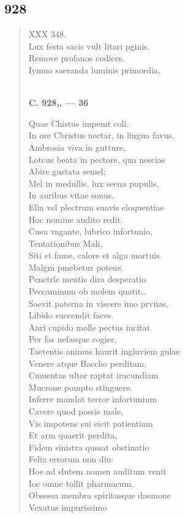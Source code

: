 \documentclass[11pt, a4paper]{report}
\begin{document}
            \subsection*{928}
      \begin{verse}
      XXX 348. \\ Lux festa sacis vult litari pginis. \\ Remove profanos codices. \\ Iymno saeranda luminis primordia, \\ 
        ﻿\pagebreak 
     \marginpar{[350]} \begin{center} \textbf{C. 928,. — 36} \end{center}Quae Chistus impemt coli. \\ In ore Cbristus nectar, in lingua favus, \\ Ambrosia viva in gutture, \\ Lotcus beata in pectore, qua nescias \\ Abire gustata semel; \\ Mel in medullis, lux seena pupulis, \\ In auribus vitae sonus. \\ Elin vel plectrum suavis eloquentiae \\ Hoc nomine audito redit. \\ Cusu vagante, lubrico infortunio, \\ Tentationibus Mali, \\ Siti et fame, calore et algu mortuis \\ Malgm pmebetur potens. \\ Penetrle mentis dira desperatio \\ Peccaminum ob molem quatit,. \\ Saevit paterna in viscere imo prviias, \\ Libido succendit faces. \\ Anri cupido molle pectus incitat \\ Per fas nefasque cogier, \\ Taetentis animus haurit ingluviem gulae \\ Venere atque Baccho perditam, \\ Cmuentus ultor raptat iracundiam \\ Mucrone pompto stinguere. \\ Inferre mandat terror infortunium \\ Cavere quod possis male, \\ Vis impotens sui eicit patientiam \\ Et arm quaerit perdita, \\ Fidem sinistra qussat obstinatio \\ Felix errorum non diu: \\ Hoe ad slutem nomen auditum venit \\ Ioc omne tollit pharmacum. \\ Obsessa membra spiritusque daemone \\ Vexatus impurissimo \\ 

\end{verse}
\end{document}

